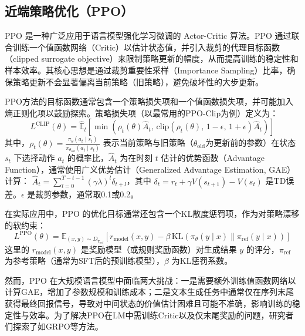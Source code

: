 \documentclass{article}
\begin{document}
\subsection{近端策略优化（PPO）}
PPO \cite{schulman2017proximal}是一种广泛应用于语言模型强化学习微调的 Actor-Critic 算法。PPO 通过联合训练一个值函数网络（Critic）以估计状态值，并引入裁剪的代理目标函数（clipped surrogate objective）来限制策略更新的幅度，从而提高训练的稳定性和样本效率。其核心思想是通过裁剪重要性采样（Importance Sampling）比率，确保策略更新不会显著偏离当前策略（旧策略），避免破坏性的大步更新。

PPO方法的目标函数通常包含一个策略损失项和一个值函数损失项，并可能加入熵正则化项以鼓励探索。策略损失项（以最常用的PPO-Clip为例）定义为：
\[
L^{\text{CLIP}}(\theta) = \hat{\mathbb{E}}_t \left[ \min \left( \rho_t(\theta) \hat{A}_t, \, \text{clip}(\rho_t(\theta), \, 1 - \epsilon, \, 1 + \epsilon) \hat{A}_t \right) \right]
\]
其中，$\rho_t(\theta) = \frac{\pi_{\theta}(a_t \mid s_t)}{\pi_{\theta_{\text{old}}}(a_t \mid s_t)}$ 表示当前策略与旧策略（$\theta_{\text{old}}$为更新前的参数）在状态 $s_t$ 下选择动作 $a_t$ 的概率比，$\hat{A}_t$ 为在时刻 $t$ 估计的优势函数（Advantage Function），通常使用广义优势估计（Generalized Advantage Estimation, GAE）计算： $\hat{A}_t = \sum_{l=0}^{T-t-1}(\gamma\lambda)^l \delta_{t+l}$，其中 $\delta_t = r_t + \gamma V(s_{t+1}) - V(s_t)$ 是TD误差。$\epsilon$ 是裁剪参数，通常取0.1或0.2。

在实际应用中，PPO 的优化目标通常还包含一个KL散度惩罚项，作为对策略漂移的软约束：
\[
L^{\text{PPO}}(\theta) = \mathbb{E}_{(x, y) \sim D_{\pi_{\text{ref}}}} \left[ r_{\text{model}}(x, y) - \beta \, \text{KL}(\pi_{\theta}(y \mid x) \| \pi_{\text{ref}}(y \mid x)) \right]
\]
这里的 $r_{\text{model}}(x, y)$ 是奖励模型（或规则奖励函数）对生成结果 $y$ 的评分，$\pi_{\text{ref}}$ 为参考策略（通常为SFT后的预训练模型），$\beta$ 为KL惩罚系数。

然而，PPO 在大规模语言模型中面临两大挑战：一是需要额外训练值函数网络以计算GAE，增加了参数规模和训练成本；二是文本生成任务中通常仅在序列末尾获得最终回报信号，导致对中间状态的价值估计困难且可能不准确，影响训练的稳定性与效率。为了解决PPO在LM中需训练Critic以及仅末尾奖励的问题，研究者们探索了如GRPO等方法。
\end{document}
